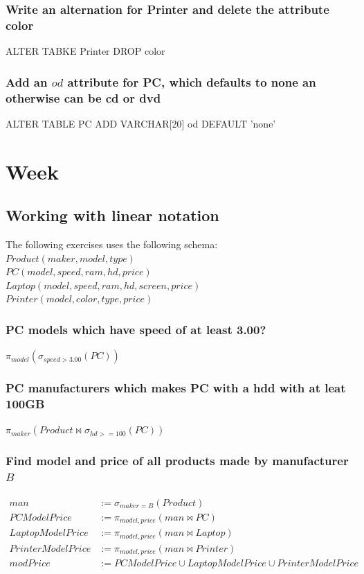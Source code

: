 \documentclass[12pt, a4paper]{article}
\begin{document}
				\subsubsection{Write an alternation for Printer and delete the attribute color}
					ALTER TABKE Printer DROP color 
				\subsubsection{Add an $od$ attribute for PC, which defaults to none an otherwise can be cd or dvd}
					ALTER TABLE PC ADD VARCHAR[20] od DEFAULT 'none'
		\section{Week}
			\subsection{Working with linear notation}
				The following exercises uses the following schema:\\
				$Product(maker, model, type)$\\
				$PC(model, speed,ram, hd, price)$\\
				$Laptop(model, speed, ram, hd ,screen, price)$\\
				$Printer(model, color, type, price)$
				\subsubsection{PC models which have speed of at least 3.00?}
					$\pi_{model}(\sigma_{speed > 3.00}(PC))$
				\subsubsection{PC manufacturers which makes PC with a hdd with at leat 100GB}
					$\pi_{maker}(Product \bowtie \sigma_{hd >= 100}(PC))$
				\subsubsection{Find model and price of all products made by manufacturer $B$}
					\begin{align*}
						man &:= \sigma_{maker = B}(Product)\\
						PCModelPrice &:= \pi_{model, price}(man \bowtie PC)\\
						LaptopModelPrice &:= \pi_{model, price}(man \bowtie Laptop)\\
						PrinterModelPrice &:= \pi_{model, price}(man \bowtie Printer)\\
						modPrice &:= PCModelPrice \cup LaptopModelPrice \cup PrinterModelPrice
					\end{align*}
\end{document}
